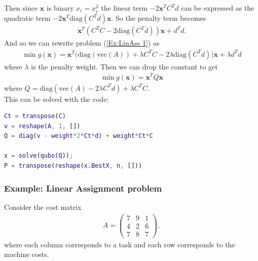 \documentclass{article}
\begin{document}
\noindent Then since \(\mathbf{x}\) is binary \(x_i = x_i^2\) the linear term \(-2\mathbf{x}^T C^T d\) can be expressed as the quadratic term \(-2\mathbf{x}^T\text{diag}(C^Td)\mathbf{x}\). So the penalty term becomes
\begin{align}
    \mathbf{x}^T(C^T C -2\text{diag}(C^Td))\mathbf{x} + d^Td. \label{penalty:CX}
\end{align}
And so we can rewrite problem (\ref{Ex:LinAss 1}) as 
\begin{align*}
    \min g(\mathbf{x}) = \mathbf{x}^T \Big(\text{diag}(\text{vec}(A)) + \lambda C^T C - 2\lambda\text{diag}(C^T d)\Big)\mathbf{x} + \lambda d^Td
\end{align*}
where \(\lambda\) is the penalty weight. Then we can drop the constant to get
\begin{align*}
    \min g(\mathbf{x}) = \mathbf{x}^T Q \mathbf{x}
\end{align*}
where \(Q = \text{diag}(\text{vec}(A) - 2\lambda C^Td) + \lambda C^T C\).\\

\noindent This can be solved with the code:
\begin{lstlisting}[language=MATLAB]
Ct = transpose(C)
v = reshape(A, 1, [])
Q = diag(v - weight*2*Ct*d) + weight*Ct*C

x = solve(qubo(Q));
P = transpose(reshape(x.BestX, n, []))
\end{lstlisting}

\subsubsection{Example: Linear Assignment problem}

Consider the cost matrix \begin{align*}
    A = \begin{pmatrix}
        7 & 9 & 1\\
        4 & 2 & 6\\
        7 & 8 & 7
    \end{pmatrix},
\end{align*}
where each column corresponds to a task and each row corresponds to the machine costs.
\end{document}
